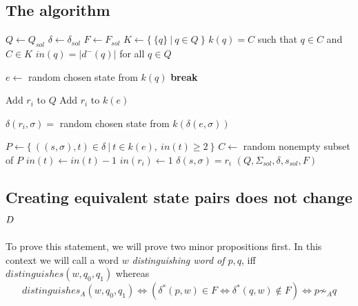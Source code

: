 \subsection{The algorithm}

\vspace{0.2cm}
\begin{spacing}{1}
\begin{algorithmic}[1]
    \State $Q \gets Q_{sol}$
    \State $\delta \gets \delta_{sol}$
    \State $F \gets F_{sol}$
	\State $K \gets \{\ \{q\}\ |\ q \in Q\ \}$ 
	\State $k(q) = C$ such that $q \in C$ and $C \in K$ 
	\State $in(q) = |d^-(q)|$ for all $q \in Q$ 
	
		 
				\State $e \gets$ random chosen state from $k(q)$
				\State \textbf{break}
			\EndIf
		\EndFor
		
        \State Add $r_i$ to $Q$ 
		\State Add $r_i$ to $k(e)$
		
		 
			\State $\delta(r_i, \sigma) =$ random chosen state from $k(\delta(e, \sigma))$
		\EndFor
		
		\State $P \gets \{\ ((s, \sigma), t) \in \delta\ |\ t \in k(e),\ in(t) \geq 2\ \}$ 
		\State $C \gets$ random nonempty subset of $P$
			\State $in(t) \gets in(t) - 1$
			\State $in(r_i) \gets 1$
            \State $\delta(s, \sigma) = r_i$
		\EndFor
	\EndFor
    \State \Return $(Q, \Sigma_{sol}, \delta, s_{sol}, F)$
	\EndFunction
\end{algorithmic}
\end{spacing}
\vspace{0.2cm}

\subsection{Creating equivalent state pairs does not change $D$} \label{ch:3:sec-D-proof}

To prove this statement, we will prove two minor propositions first. In this context we will call a word $w$ \emph{distinguishing word of $p,q$}, iff $distinguishes(w, q_0, q_1)$ whereas
\[
    distinguishes_A(w, q_0, q_1) \Leftrightarrow (\delta^*(p,w) \in F \Leftrightarrow \delta^*(q,w) \notin F) \Leftrightarrow p \not\sim_A q
\]

